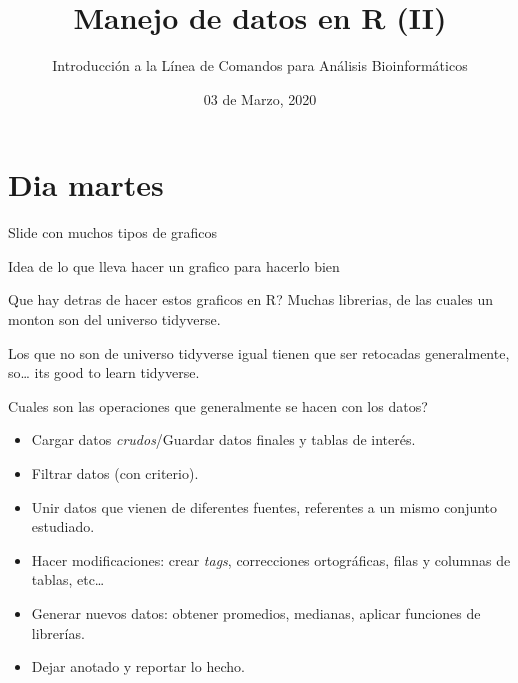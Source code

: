 \documentclass[ignorenonframetext,]{beamer}
\title{Manejo de datos en R (II)}
\author{Introducción a la Línea de Comandos para Análisis Bioinformáticos}
\date{03 de Marzo, 2020}
\providecommand{\tightlist}{%
  \setlength{\itemsep}{0pt}\setlength{\parskip}{0pt}}
\begin{document}
\frame{\titlepage}

\hypertarget{dia-martes}{%
\section{Dia martes}\label{dia-martes}}

\begin{frame}{Slide con muchos tipos de graficos}
\protect\hypertarget{slide-con-muchos-tipos-de-graficos}{}

\end{frame}

\begin{frame}{Idea de lo que lleva hacer un grafico para hacerlo bien}
\protect\hypertarget{idea-de-lo-que-lleva-hacer-un-grafico-para-hacerlo-bien}{}

\end{frame}

\begin{frame}{Que hay detras de hacer estos graficos en R? Muchas
librerias, de las cuales un monton son del universo tidyverse.}
\protect\hypertarget{que-hay-detras-de-hacer-estos-graficos-en-r-muchas-librerias-de-las-cuales-un-monton-son-del-universo-tidyverse.}{}

\end{frame}

\begin{frame}{Los que no son de universo tidyverse igual tienen que ser
retocadas generalmente, so\ldots{} its good to learn tidyverse.}
\protect\hypertarget{los-que-no-son-de-universo-tidyverse-igual-tienen-que-ser-retocadas-generalmente-so-its-good-to-learn-tidyverse.}{}

\end{frame}

\begin{frame}{Cuales son las operaciones que generalmente se hacen con
los datos?}
\protect\hypertarget{cuales-son-las-operaciones-que-generalmente-se-hacen-con-los-datos}{}

\begin{itemize}
\tightlist
\item
  Cargar datos \emph{crudos}/Guardar datos finales y tablas de interés.
\item
  Filtrar datos (con criterio).
\item
  Unir datos que vienen de diferentes fuentes, referentes a un mismo
  conjunto estudiado.
\item
  Hacer modificaciones: crear \emph{tags}, correcciones ortográficas,
  filas y columnas de tablas, etc\ldots{}
\item
  Generar nuevos datos: obtener promedios, medianas, aplicar funciones
  de librerías.
\item
  Dejar anotado y reportar lo hecho.
\end{itemize}

\end{frame}
\end{document}
